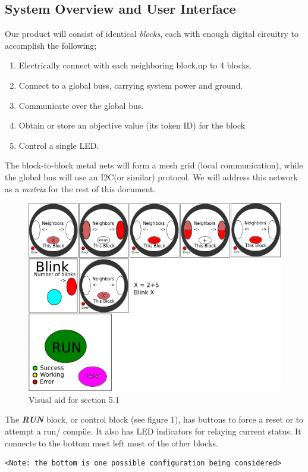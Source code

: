 \subsection{System Overview and User Interface}
 Our product will consist of identical \textit{blocks}, each with enough digital circuitry to accomplish the following;
  \begin{enumerate} 
  \item Electrically connect with each neighboring block,up to 4 blocks. \item Connect to a global buss, carrying system power and ground.
  \item Communicate over the global bus. 
  \item Obtain or store an objective value (its token ID) for the block
  \item Control a single LED.	 
  \end{enumerate}
   The block-to-block metal nets will form a mesh grid (local communication), while the  global bus will use an I2C(or similar) protocol. We will address this network as a \textit{matrix} for the rest of this document.
  \begin{figure}[H]
   \centering
    \includegraphics[width=6in]{user_interface}
    \caption{Visual aid for section 5.1}
   \end{figure}

\vspace{.5cm}
The  \textit{\textbf{RUN}} block, or control block (see figure 1), has buttons to  force a reset or to attempt a run/ compile.  It also has LED indicators for relaying current status. It connects to the bottom most left most of the other blocks. \begin{verbatim}
<Note: the bottom is one possible configuration being considered> 
\end{verbatim}

